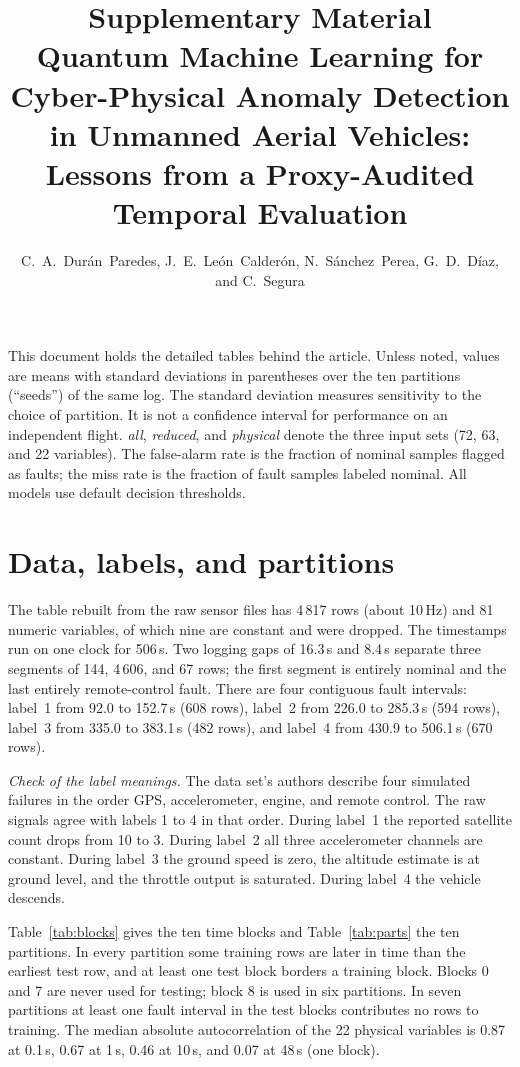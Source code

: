 \documentclass[10pt,a4paper]{article}
\title{Supplementary Material\\[4pt]\large Quantum Machine Learning for Cyber-Physical Anomaly Detection in
Unmanned Aerial Vehicles: Lessons from a Proxy-Audited Temporal Evaluation}
\author{C.~A.~Dur\'an~Paredes, J.~E.~Le\'on~Calder\'on, N.~S\'anchez~Perea, G.~D.~D\'iaz, and C.~Segura}
\date{}
\begin{document}
\maketitle

This document holds the detailed tables behind the article. Unless noted,
values are means with standard deviations in parentheses over the ten
partitions (``seeds'') of the same log. The standard deviation measures
sensitivity to the choice of partition. It is not a confidence interval for
performance on an independent flight. \emph{all}, \emph{reduced}, and
\emph{physical} denote the three input sets (72, 63, and 22 variables).
The false-alarm rate is the fraction of nominal samples flagged as faults;
the miss rate is the fraction of fault samples labeled nominal. All models
use default decision thresholds.

\section{Data, labels, and partitions}
The table rebuilt from the raw sensor files has 4\,817 rows (about 10\,Hz)
and 81 numeric variables, of which nine are constant and were dropped. The
timestamps run on one clock for 506\,s. Two logging gaps of 16.3\,s and
8.4\,s separate three segments of 144, 4\,606, and 67 rows; the first
segment is entirely nominal and the last entirely remote-control fault.
There are four contiguous fault intervals: label~1 from 92.0 to 152.7\,s
(608 rows), label~2 from 226.0 to 285.3\,s (594 rows), label~3 from 335.0
to 383.1\,s (482 rows), and label~4 from 430.9 to 506.1\,s (670 rows).

\emph{Check of the label meanings.} The data set's authors describe four
simulated failures in the order GPS, accelerometer, engine, and remote
control. The raw signals agree with labels 1 to 4 in that order. During
label~1 the reported satellite count drops from 10 to 3. During label~2
all three accelerometer channels are constant. During label~3 the ground
speed is zero, the altitude estimate is at ground level, and the throttle
output is saturated. During label~4 the vehicle descends.

Table~\ref{tab:blocks} gives the ten time blocks and Table~\ref{tab:parts}
the ten partitions. In every partition some training rows are later in
time than the earliest test row, and at least one test block borders a
training block. Blocks 0 and 7 are never used for testing; block 8 is used
in six partitions. In seven partitions at least one fault interval in the
test blocks contributes no rows to training. The median absolute
autocorrelation of the 22 physical variables is 0.87 at 0.1\,s, 0.67 at
1\,s, 0.46 at 10\,s, and 0.07 at 48\,s (one block).
\end{document}
